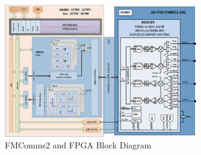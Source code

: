 \begin{figure}[htbp]
    \centering
    \includegraphics[width=0.75\textwidth]{./figures/fmcomms2_bd}
    \caption{ FMComms2 and FPGA Block Diagram
    \label{fig:fmcommbd}}
\end{figure}



